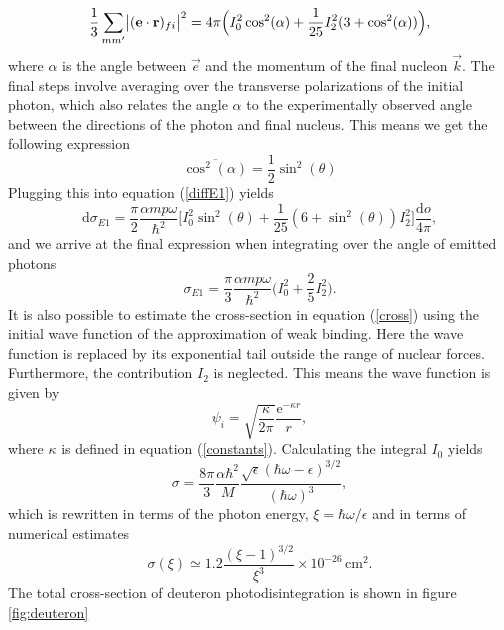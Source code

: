 \begin{equation}
	\frac{1}{3} \sum_{mm'} \abs{(\bm{\mathrm{e}}\cdot \bm{\mathrm{r}})_{fi}}^2 = 4\pi \Big(I_0^2\cos^2(\alpha) + \frac{1}{25}I_2^2(3+\cos^2(\alpha)) \Big),
\end{equation}
where $\alpha$ is the angle between $\vec{e}$ and the momentum of the final nucleon $\vec{k}$. The final steps involve averaging over the transverse polarizations of the initial photon, which also relates the angle $\alpha$ to the experimentally observed angle between the directions of the photon and final nucleus. This means we get the following expression
\begin{equation} 
	\overline{\cos^2(\alpha)} = \frac{1}{2}\sin^2(\theta)
\end{equation}
Plugging this into equation (\ref{diffE1}) yields
\begin{equation} \label{diffcross2}
	\textrm{d}\sigma_{E1} = \frac{\pi}{2}\frac{\alpha m p \omega}{\hbar^2} \Big[I_0^2 \sin^2(\theta)+\frac{1}{25}(6+\sin^2(\theta))I_2^2 \Big] \frac{\textrm{d}o}{4\pi},
\end{equation}
and we arrive at the final expression when integrating over the angle of emitted photons
\begin{equation} \label{cross}
	\sigma_{E1} = \frac{\pi}{3}\frac{\alpha m p \omega}{\hbar^2} \Big( I_0^2+\frac{2}{5}I_2^2\Big).
\end{equation}
It is also possible to estimate the cross-section in equation (\ref{cross}) using the initial wave function of the approximation of weak binding. Here the wave function is replaced by its exponential tail outside the range of nuclear forces. Furthermore, the contribution $I_2$ is neglected. This means the wave function is given by
\begin{equation}
	\psi_i = \sqrt{\frac{\kappa}{2\pi}} \frac{\textrm{e}^{-\kappa r}}{r},
\end{equation}
where $\kappa$ is defined in equation (\ref{constants}). Calculating the integral $I_0$ yields
\begin{equation}
	\sigma = \frac{8\pi}{3} \frac{\alpha\hbar^2}{M}\frac{\sqrt{\epsilon}(\hbar\omega-\epsilon)^{3/2}}{(\hbar\omega)^3},
\end{equation}
which is rewritten in terms of the photon energy, $\xi = \hbar \omega/\epsilon$ and in terms of numerical estimates
\begin{equation}
	\sigma(\xi) \simeq  1.2\frac{(\xi-1)^{3/2}}{\xi^3}\times 10^{-26} \, \textrm{cm}^2.
\end{equation}
The total cross-section of deuteron photodisintegration is shown in figure \ref{fig:deuteron}
